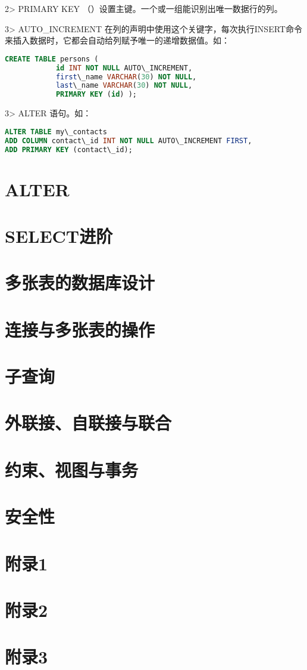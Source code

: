 \documentclass[UTF8]{ctexart}
\begin{document}
2> PRIMARY KEY （）设置主键。一个或一组能识别出唯一数据行的列。

3> AUTO\_INCREMENT 在列的声明中使用这个关键字，每次执行INSERT命令来插入数据时，它都会自动给列赋予唯一的递增数据值。如：
\begin{lstlisting}[language = SQL]
CREATE TABLE persons (
			id INT NOT NULL AUTO\_INCREMENT,
			first\_name VARCHAR(30) NOT NULL,
			last\_name VARCHAR(30) NOT NULL,
			PRIMARY KEY (id) );
\end{lstlisting}
3> ALTER 语句。如：
\begin{lstlisting}[language = SQL]
ALTER TABLE my\_contacts 
ADD COLUMN contact\_id INT NOT NULL AUTO\_INCREMENT FIRST,
ADD PRIMARY KEY (contact\_id);
\end{lstlisting}
\section{ALTER}
\section{SELECT进阶}
\section{多张表的数据库设计}
\section{连接与多张表的操作}
\section{子查询}
\section{外联接、自联接与联合}
\section{约束、视图与事务}
\section{安全性}
\section{附录1}
\section{附录2}
\section{附录3}
\end{document}
